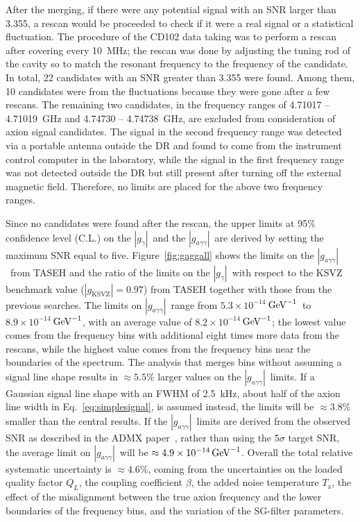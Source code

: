 \documentclass[%
 reprint,prl, %
superscriptaddress,
 amsmath,amssymb,
 aps,
]{revtex4-2}
\newcommand{\gagg}{\ensuremath{\left|g_{a\gamma\gamma}\right|}}
\newcommand{\ggamma}{\ensuremath{\left|g_{\gamma}\right|}}
\newcommand{\ma}{\ensuremath{m_a}}
\newcommand{\ta}{\ensuremath{T_\text{a}}}
\newcommand{\muevcc}{\ensuremath{\,\mu\text{e\hspace{-.08em}V}}}
\newcommand{\GeVinv}{\ensuremath{\,\text{Ge\hspace{-.08em}V}^{-1}}}
\newcommand{\flo}{\ensuremath{4.70750}}
\newcommand{\fhi}{\ensuremath{4.79815}}
\newcommand{\mlo}{\ensuremath{19.4687}}
\newcommand{\mhi}{\ensuremath{19.8436}}
\newcommand{\avelimit}{\ensuremath{8.2\times 10^{-14}}} %
\newcommand{\ADMXavelimit}{\ensuremath{4.9\times 10^{-14}}}
\newcommand{\lolimit}{\ensuremath{5.3\times 10^{-14}}}
\newcommand{\hilimit}{\ensuremath{8.9\times 10^{-14}}}
\begin{document}
 After the merging, if there were any potential signal with an SNR larger than 
3.355, a rescan would be proceeded to check if it were a real signal 
or a statistical fluctuation. 
The procedure of the CD102 data taking was to perform a rescan after 
covering every 10~MHz; the rescan was done by adjusting the tuning rod of the 
cavity so to match the resonant frequency to the frequency of the candidate. 
In total, 22 candidates with an SNR greater than 3.355 were found. 
Among them, 10 candidates were from the fluctuations because they were gone 
after a few rescans. 
The remaining two candidates, in the frequency ranges of 
4.71017 -- 4.71019~GHz and 4.74730 -- 4.74738~GHz, are excluded from 
consideration of axion signal candidates. The signal in the second frequency 
range was detected via a portable antenna outside the DR and found 
to come from the instrument control computer in the laboratory, while the 
signal in the first frequency range was not 
detected outside the DR but still present after 
turning off the external magnetic field. 
Therefore, no limits are placed for the above two frequency ranges.  

Since no candidates were found after the rescan, the upper limits 
at 95\% confidence level (C.L.) on the \ggamma\ and the 
 \gagg\ are derived by setting the maximum SNR equal to five.  
Figure~\ref{fig:gaggall} shows the limits on the \gagg\ from TASEH and the 
ratio of the limits on the \ggamma\ 
with respect to the KSVZ benchmark value ($\left|g_\text{KSVZ}\right|=0.97$) 
from TASEH together with those from the previous searches. 
The limits on 
\gagg\ range from \lolimit\GeVinv\ to \hilimit\GeVinv, with an average 
value of \avelimit\GeVinv; the lowest value comes from the frequency bins with 
additional eight times more data from the rescans, while the highest value 
comes from the frequency bins near the boundaries of the spectrum. 
%
The analysis that merges bins without 
assuming a signal line shape results in $\approx5.5$\% larger values on the 
\gagg\ limits. If a Gaussian signal line shape with an FWHM of 2.5~kHz,  
about half of the axion line width in Eq.~\eqref{eq:simplesignal}, is 
assumed instead, the limits will be $\approx3.8$\% smaller than the central 
results. If the \gagg\ limits are derived from the observed SNR as described 
in the ADMX paper~\cite{ADMXVIII},
rather than using the 5$\sigma$ target SNR, the average limit on \gagg\ will
be $\approx\ADMXavelimit\GeVinv$. 
%
Overall the total relative systematic uncertainty is 
$\approx 4.6\%$, coming from the uncertainties on the loaded quality 
factor $Q_L$, the coupling coefficient $\beta$, the added noise temperature 
\ta, the effect of the misalignment between the true axion frequency and 
the lower boundaries of the frequency bins, and the variation of the 
SG-filter parameters. 
\end{document}
